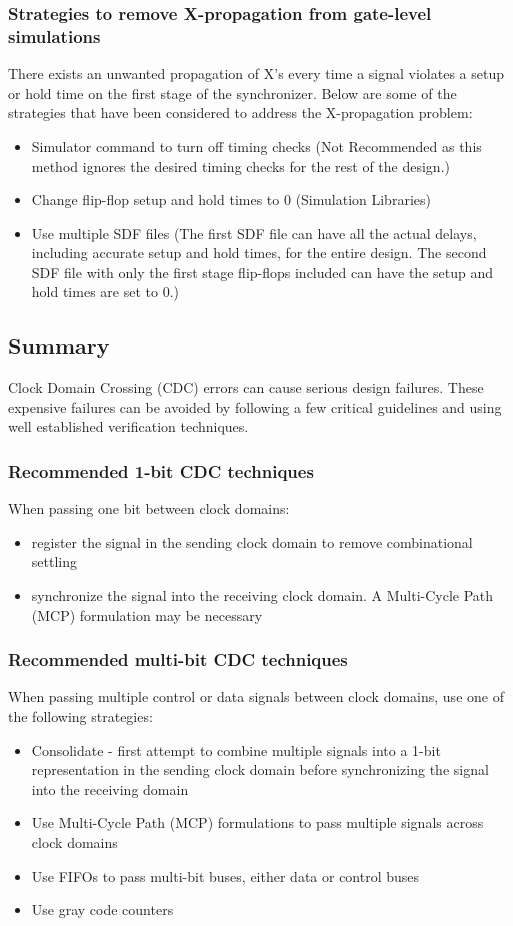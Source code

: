 \subsubsection{Strategies to remove X-propagation from gate-level simulations}
There exists an unwanted propagation of X's every time a signal violates a setup or hold time on the first stage of the synchronizer.
Below are some of the strategies that have
been considered to address the X-propagation problem: 
\begin{itemize}
	\item Simulator command to turn off timing checks (Not Recommended as this method ignores the desired timing checks for the rest of the design.)
	\item Change flip-flop setup and hold times to 0 (Simulation Libraries)
	\item Use multiple SDF files (The first SDF file can have all the actual delays, including accurate setup and hold times, for the entire design. The second SDF file with only the first stage flip-flops included can have the setup and hold times are set to 0.) 
\end{itemize}

\subsection{Summary}
Clock Domain Crossing (CDC) errors can cause serious design failures. These expensive failures can be avoided by following a few critical guidelines and using well established verification techniques.

\subsubsection{Recommended 1-bit CDC techniques}
When passing one bit between clock domains:
\begin{itemize}
	\item register the signal in the sending clock domain to remove combinational settling
	\item synchronize the signal into the receiving clock domain. A Multi-Cycle Path (MCP) formulation may be necessary
\end{itemize}

\subsubsection{Recommended multi-bit CDC techniques}
When passing multiple control or data signals between clock domains, use one of the following strategies:
\begin{itemize}
	\item Consolidate - first attempt to combine multiple signals into a 1-bit representation in the sending clock domain before synchronizing the signal into the receiving domain
	\item Use Multi-Cycle Path (MCP) formulations to pass multiple signals across clock domains
	\item Use FIFOs to pass multi-bit buses, either data or control buses
	\item Use gray code counters
\end{itemize}

